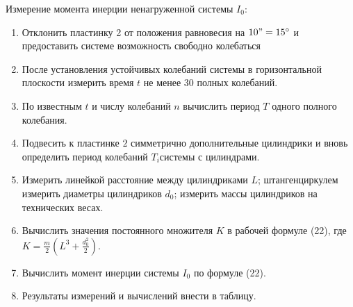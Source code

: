 
    \item Измерение момента инерции ненагруженной системы $I_0$:
    \begin{enumerate}
        \item Отклонить пластинку 2 от положения равновесия на $10"=15^\circ$
        и предоставить системе возможность свободно колебаться
        \item После установления устойчивых колебаний системы в горизонтальной
        плоскости измерить время $t$ не менее 30 полных колебаний.
        \item По известным $t$ и числу колебаний $n$ вычислить период $T$ одного полного колебания.
        \item Подвесить к пластинке $2$ симметрично дополнительные цилиндрики и вновь определить
        период колебаний $T_i$системы с цилиндрами.
        \item Измерить линейкой расстояние между цилиндриками $L$;
        штангенциркулем измерить диаметры цилиндриков $d_0$;
        измерить массы цилиндриков на технических весах.
        \item Вычислить значения постоянного множителя $K$ в рабочей формуле (22),
        где $K = \frac{m}{2}(L^3 + \frac{d_0^2}{2})$.
        \item Вычислить момент инерции системы $I_0$ по формуле (22).
        \item Результаты измерений и вычислений внести в таблицу.
    \end{enumerate} 